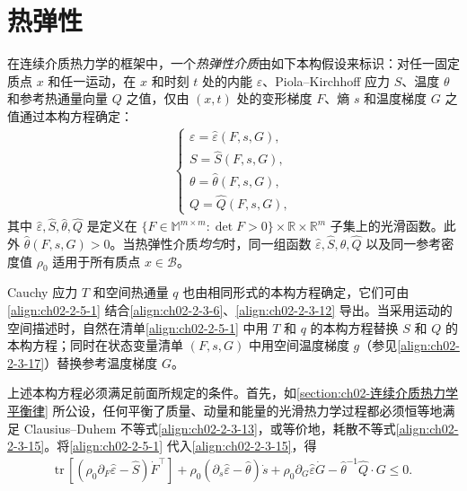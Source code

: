 \documentclass[../../main.tex]{subfiles}
\begin{document}
\section{热弹性}\label{section:ch02-热弹性}

在连续介质热力学的框架中，一个\emph{热弹性介质}由如下本构假设来标识：对任一固定质点 $x$ 和任一运动，在 $x$ 和时刻 $t$ 处的内能 $\varepsilon$、Piola--Kirchhoff 应力 $S$、温度 $\theta$ 和参考热通量向量 $Q$ 之值，仅由 $(x,t)$ 处的变形梯度 $F$、熵 $s$ 和温度梯度 $G$ 之值通过本构方程确定：
\begin{align}
\begin{cases}
\varepsilon=\hat{\varepsilon}(F,s,G),\\
S=\hat{S}(F,s,G),\\
\theta=\hat{\theta}(F,s,G),\\
Q=\hat{Q}(F,s,G),
\end{cases}
\label{align:ch02-2-5-1}
\end{align}
其中 $\hat{\varepsilon},\hat{S},\hat{\theta},\hat{Q}$ 是定义在 $\{F\in\mathbb{M}^{m\times m}:\det F>0\}\times\mathbb{R}\times\mathbb{R}^{m}$ 子集上的光滑函数。此外 $\hat{\theta}(F,s,G)>0$。当热弹性介质\emph{均匀}时，同一组函数 $\hat{\varepsilon},\hat{S},\hat{\theta},\hat{Q}$ 以及同一参考密度值 $\rho_{0}$ 适用于所有质点 $x\in\mathscr{B}$。

Cauchy 应力 $T$ 和空间热通量 $q$ 也由相同形式的本构方程确定，它们可由\eqref{align:ch02-2-5-1} 结合\eqref{align:ch02-2-3-6}、\eqref{align:ch02-2-3-12} 导出。当采用运动的空间描述时，自然在清单\eqref{align:ch02-2-5-1} 中用 $T$ 和 $q$ 的本构方程替换 $S$ 和 $Q$ 的本构方程；同时在状态变量清单 $(F,s,G)$ 中用空间温度梯度 $g$（参见\eqref{align:ch02-2-3-17}）替换参考温度梯度 $G$。

上述本构方程必须满足前面所规定的条件。首先，如\cref{section:ch02-连续介质热力学平衡律} 所公设，任何平衡了质量、动量和能量的光滑热力学过程都必须恒等地满足 Clausius--Duhem 不等式\eqref{align:ch02-2-3-13}，或等价地，耗散不等式\eqref{align:ch02-2-3-15}。将\eqref{align:ch02-2-5-1} 代入\eqref{align:ch02-2-3-15}，得
\begin{align}
\mathrm{tr}\,[(\rho_{0}\partial_{F}\hat{\varepsilon}-\hat{S})\dot{F}^{\top}]+\rho_{0}(\partial_{s}\hat{\varepsilon}-\hat{\theta})\dot{s}+\rho_{0}\partial_{G}\hat{\varepsilon}\dot{G}-\hat{\theta}^{-1}\hat{Q}\cdot G\leqslant 0.
\label{align:ch02-2-5-2}
\end{align}
\end{document}

